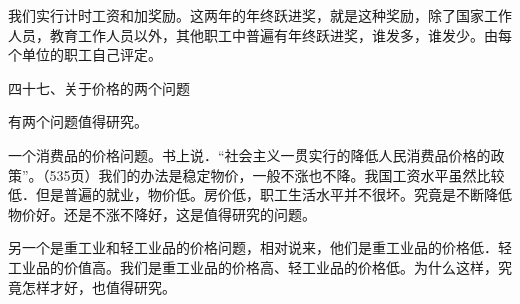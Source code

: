 我们实行计时工资和加奖励。这两年的年终跃进奖，就是这种奖励，除了国家工作人员，教育工作人员以外，其他职工中普遍有年终跃进奖，谁发多，谁发少。由每个单位的职工自己评定。

四十七、关于价格的两个问题

有两个问题值得研究。

一个消费品的价格问题。书上说．“社会主义一贯实行的降低人民消费品价格的政策”。（535页）我们的办法是稳定物价，一般不涨也不降。我国工资水平虽然比较低．但是普遍的就业，物价低。房价低，职工生活水平并不很坏。究竟是不断降低物价好。还是不涨不降好，这是值得研究的问题。

另一个是重工业和轻工业品的价格问题，相对说来，他们是重工业品的价格低．轻工业品的价值高。我们是重工业品的价格高、轻工业品的价格低。为什么这样，究竟怎样才好，也值得研究。



